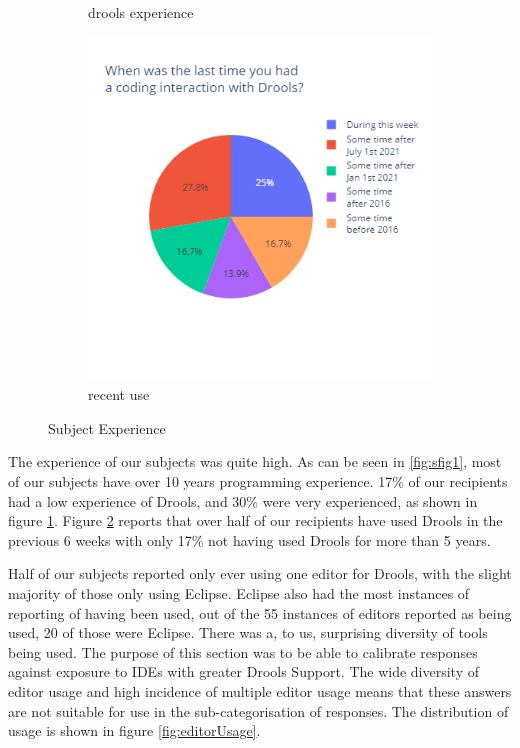 \begin{figure}[H]
\begin{subfigure}{.33\textwidth}
      \caption{drools experience}
      \label{fig:sfig2}
    \end{subfigure}
    \begin{subfigure}{.33\textwidth}
        \centering
        \includegraphics[width=.95\linewidth]{Sections/images/pie_recentusage.png}
        \caption{recent use}
        \label{fig:sfig3}
      \end{subfigure}
    \caption{Subject Experience}
    \label{fig:subject_experience}
\end{figure}

The experience of our subjects was quite high.
As can be seen in \ref{fig:sfig1}, most of our subjects have over 10 years programming experience.
17\% of our recipients had a low experience of Drools, and 30\% were very experienced, as shown in figure \ref{fig:sfig2}.
Figure \ref{fig:sfig3} reports that over half of our recipients have used Drools in the previous 6 weeks with only 17\% not having used Drools for more than 5 years.

Half of our subjects reported only ever using one editor for Drools, with the slight majority of those only using Eclipse.
Eclipse also had the most instances of reporting of having been used, out of the 55 instances of editors reported as being used, 20 of those were Eclipse.
There was a, to us, surprising diversity of tools being used.
The purpose of this section was to be able to calibrate responses against exposure to IDEs with greater Drools Support.
The wide diversity of editor usage and high incidence of multiple editor usage means that these answers are not suitable for use in the sub-categorisation of responses. 
The distribution of usage is shown in figure \ref{fig:editorUsage}.

